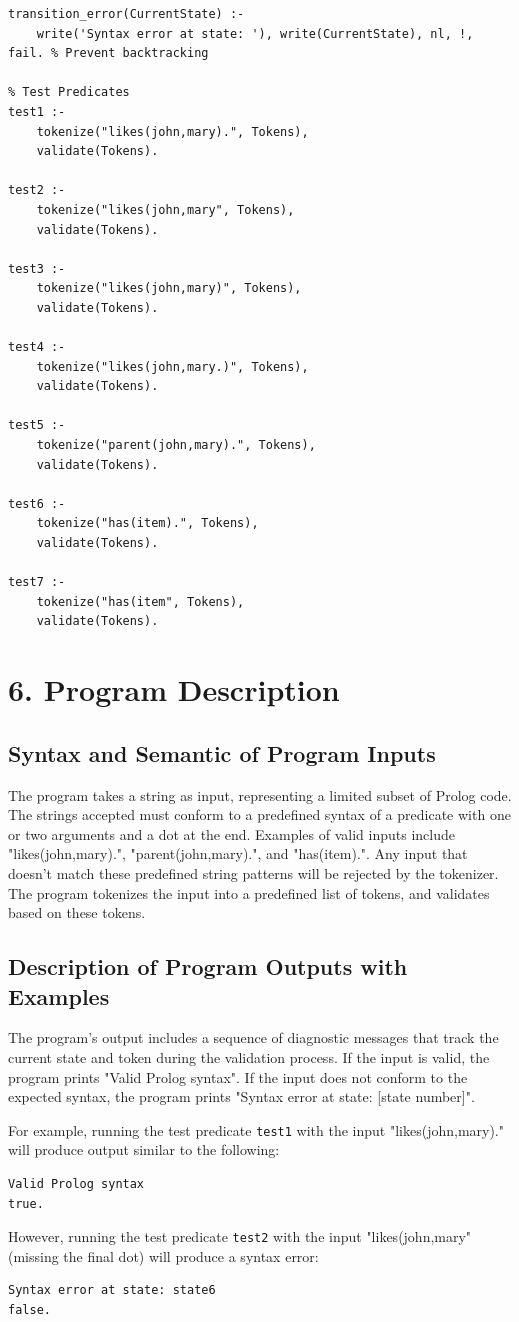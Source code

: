 \documentclass{article}
\begin{document}
\begin{lstlisting}[caption=validator.pl]
% Transition error handling
transition_error(CurrentState) :-
    write('Syntax error at state: '), write(CurrentState), nl, !, fail. % Prevent backtracking

% Test Predicates
test1 :-
    tokenize("likes(john,mary).", Tokens),
    validate(Tokens).

test2 :-
    tokenize("likes(john,mary", Tokens),
    validate(Tokens).

test3 :-
    tokenize("likes(john,mary)", Tokens),
    validate(Tokens).

test4 :-
    tokenize("likes(john,mary.)", Tokens),
    validate(Tokens).

test5 :-
    tokenize("parent(john,mary).", Tokens),
    validate(Tokens).

test6 :-
    tokenize("has(item).", Tokens),
    validate(Tokens).

test7 :-
    tokenize("has(item", Tokens),
    validate(Tokens).
\end{lstlisting}
\section*{6. Program Description}
\subsection*{Syntax and Semantic of Program Inputs}
The program takes a string as input, representing a limited subset of Prolog code. The strings accepted must conform to a predefined syntax of a predicate with one or two arguments and a dot at the end. Examples of valid inputs include "likes(john,mary).", "parent(john,mary).", and "has(item).". Any input that doesn't match these predefined string patterns will be rejected by the tokenizer. The program tokenizes the input into a predefined list of tokens, and validates based on these tokens.
\subsection*{Description of Program Outputs with Examples}
The program's output includes a sequence of diagnostic messages that track the current state and token during the validation process. If the input is valid, the program prints "Valid Prolog syntax". If the input does not conform to the expected syntax, the program prints "Syntax error at state: [state number]".

For example, running the test predicate \texttt{test1} with the input "likes(john,mary)." will produce output similar to the following:
\begin{verbatim}
Valid Prolog syntax
true.
\end{verbatim}
However, running the test predicate \texttt{test2} with the input "likes(john,mary" (missing the final dot) will produce a syntax error:
\begin{verbatim}
Syntax error at state: state6
false.
\end{verbatim}
\end{document}
